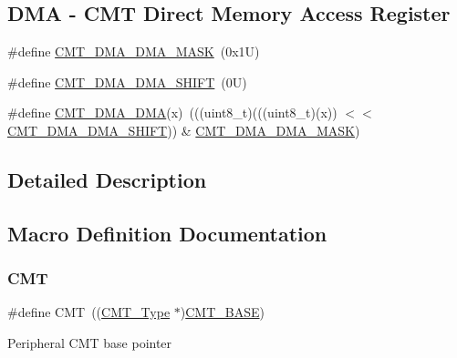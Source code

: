 \subsection*{D\+MA -\/ C\+MT Direct Memory Access Register}
\begin{DoxyCompactItemize}
\item 
\#define \mbox{\hyperlink{group___c_m_t___register___masks_ga65c04dcbc5d319c8f0532568570e555a}{C\+M\+T\+\_\+\+D\+M\+A\+\_\+\+D\+M\+A\+\_\+\+M\+A\+SK}}~(0x1\+U)
\item 
\#define \mbox{\hyperlink{group___c_m_t___register___masks_gaf60148184935a9ae825cecc482734b31}{C\+M\+T\+\_\+\+D\+M\+A\+\_\+\+D\+M\+A\+\_\+\+S\+H\+I\+FT}}~(0\+U)
\item 
\#define \mbox{\hyperlink{group___c_m_t___register___masks_gae6e1b455275221bab4a30aa507d1054a}{C\+M\+T\+\_\+\+D\+M\+A\+\_\+\+D\+MA}}(x)~(((uint8\+\_\+t)(((uint8\+\_\+t)(x)) $<$$<$ \mbox{\hyperlink{group___c_m_t___register___masks_gaf60148184935a9ae825cecc482734b31}{C\+M\+T\+\_\+\+D\+M\+A\+\_\+\+D\+M\+A\+\_\+\+S\+H\+I\+FT}})) \& \mbox{\hyperlink{group___c_m_t___register___masks_ga65c04dcbc5d319c8f0532568570e555a}{C\+M\+T\+\_\+\+D\+M\+A\+\_\+\+D\+M\+A\+\_\+\+M\+A\+SK}})
\end{DoxyCompactItemize}


\subsection{Detailed Description}


\subsection{Macro Definition Documentation}
\mbox{\label{group___c_m_t___register___masks_ga20a0cd761e563c3a1a75267b661ac5b8}} 
\subsubsection{\texorpdfstring{C\+MT}{CMT}}
{\footnotesize\ttfamily \#define C\+MT~((\mbox{\hyperlink{struct_c_m_t___type}{C\+M\+T\+\_\+\+Type}} $\ast$)\mbox{\hyperlink{group___c_m_t___register___masks_ga53e160517651b4460f52bf43fe1e197a}{C\+M\+T\+\_\+\+B\+A\+SE}})}

Peripheral C\+MT base pointer \mbox{\label{group___c_m_t___register___masks_ga53e160517651b4460f52bf43fe1e197a}} 
